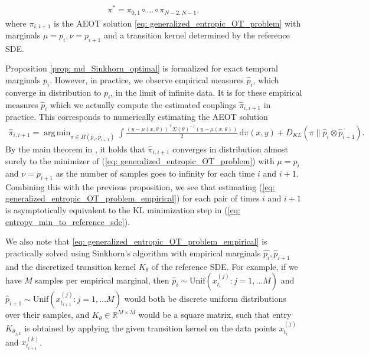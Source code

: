 \documentclass[twoside,11pt]{article}
\newcommand{\R} {\mathbb R}
\DeclareMathOperator*{\argmin}{arg\,min}
\begin{document}
\begin{align*}
    \pi^* = \pi_{0,1} \circ \ldots \circ \pi_{N-2,N-1},
\end{align*}
where $\pi_{i,i+1}$ is the AEOT solution \eqref{eq: generalized_entropic_OT_problem} with marginals $\mu = p_i, \nu = p_{i+1}$ and a transition kernel determined by the reference SDE.


\begin{remark}
    Proposition \ref{prop: md_Sinkhorn_optimal} is formalized for exact temporal marginals $p_i$. However, in practice, we observe empirical measures $\hat{p}_i$, which converge in distribution to $p_i$, in the limit of infinite data. It is for these empirical measures $\hat{p}_i$ which we actually compute the estimated couplings $\hat{\pi}_{i,i+1}$ in practice. This corresponds to numerically estimating the AEOT solution
\begin{align}
\hat{\pi}_{i,i+1} = \argmin_{\pi \in \Pi(\hat{p}_i,\hat{p}_{i+1})} \int \frac{(y-\mu(x, \theta))^\top \Sigma(\theta)^{-1}(y-\mu(x, \theta))}{2} \, \mathrm{d}\pi(x,y) + D_{KL}(\pi \| \hat{p}_i \otimes \hat{p}_{i+1}).
\label{eq: generalized_entropic_OT_problem_empirical}
\end{align}
By the main theorem in \citet{ghosal2022stability}, it holds that $\hat{\pi}_{i,i+1}$ converges in distribution almost surely to the minimizer of (\ref{eq: generalized_entropic_OT_problem}) with $\mu=p_i$ and $\nu=p_{i+1}$ as the number of samples goes to infinity for each time $i$ and $i+1$. Combining this with the previous proposition, we see that estimating (\ref{eq: generalized_entropic_OT_problem_empirical}) for each pair of times $i$ and $i+1$ is asymptotically equivalent to the KL minimization step in (\ref{eq: entropy_min_to_reference_sde}).

We also note that \eqref{eq: generalized_entropic_OT_problem_empirical} is practically solved using Sinkhorn's algorithm with empirical marginals $\hat{p_i}, \hat{p}_{i+1}$ and the discretized transition kernel $K_\theta$ of the reference SDE. For example, if we have $M$ samples per empirical marginal, then $\hat{p}_i \sim \text{Unif}(x_{t_i}^{(j)}: j=1, \ldots M)$ and $\hat{p}_{i+1}\sim \text{Unif}(x_{t_{i+1}}^{(j)}: j=1, \ldots M)$ would both be discrete uniform distributions over their samples, and $K_\theta \in \R^{M \times M}$ would be a square matrix, such that entry $K_{\theta_{j,k}}$ is obtained by applying the given transition kernel on the data points $x_{t_i}^{(j)}$ and $x_{t_{i+1}}^{(k)}$.
\end{remark}
\end{document}

